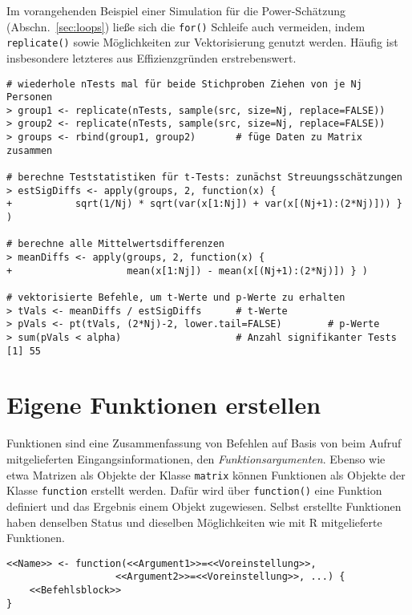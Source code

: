 Im vorangehenden Beispiel einer Simulation für die Power-Schätzung (Abschn.\ \ref{sec:loops}) ließe sich die \lstinline!for()! Schleife auch vermeiden, indem \lstinline!replicate()! sowie Möglichkeiten zur Vektorisierung genutzt werden. Häufig ist insbesondere letzteres aus Effizienzgründen erstrebenswert.
\begin{lstlisting}
# wiederhole nTests mal für beide Stichproben Ziehen von je Nj Personen
> group1 <- replicate(nTests, sample(src, size=Nj, replace=FALSE))
> group2 <- replicate(nTests, sample(src, size=Nj, replace=FALSE))
> groups <- rbind(group1, group2)       # füge Daten zu Matrix zusammen

# berechne Teststatistiken für t-Tests: zunächst Streuungsschätzungen
> estSigDiffs <- apply(groups, 2, function(x) {
+           sqrt(1/Nj) * sqrt(var(x[1:Nj]) + var(x[(Nj+1):(2*Nj)])) } )

# berechne alle Mittelwertsdifferenzen
> meanDiffs <- apply(groups, 2, function(x) {
+                    mean(x[1:Nj]) - mean(x[(Nj+1):(2*Nj)]) } )

# vektorisierte Befehle, um t-Werte und p-Werte zu erhalten
> tVals <- meanDiffs / estSigDiffs      # t-Werte
> pVals <- pt(tVals, (2*Nj)-2, lower.tail=FALSE)        # p-Werte
> sum(pVals < alpha)                    # Anzahl signifikanter Tests
[1] 55
\end{lstlisting}

\section{Eigene Funktionen erstellen}
\label{sec:function}

Funktionen sind eine Zusammenfassung von Befehlen auf Basis von beim Aufruf mitgelieferten Eingangsinformationen, den \emph{Funktionsargumenten}. Ebenso wie etwa Matrizen als Objekte der Klasse \lstinline!matrix! können Funktionen als Objekte der Klasse \lstinline!function! erstellt werden. Dafür wird über \lstinline!function()! eine Funktion definiert und das Ergebnis einem Objekt zugewiesen. Selbst erstellte Funktionen haben denselben Status und dieselben Möglichkeiten wie mit R mitgelieferte Funktionen.
\begin{lstlisting}
<<Name>> <- function(<<Argument1>>=<<Voreinstellung>>,
                   <<Argument2>>=<<Voreinstellung>>, ...) {
    <<Befehlsblock>>
}
\end{lstlisting}

